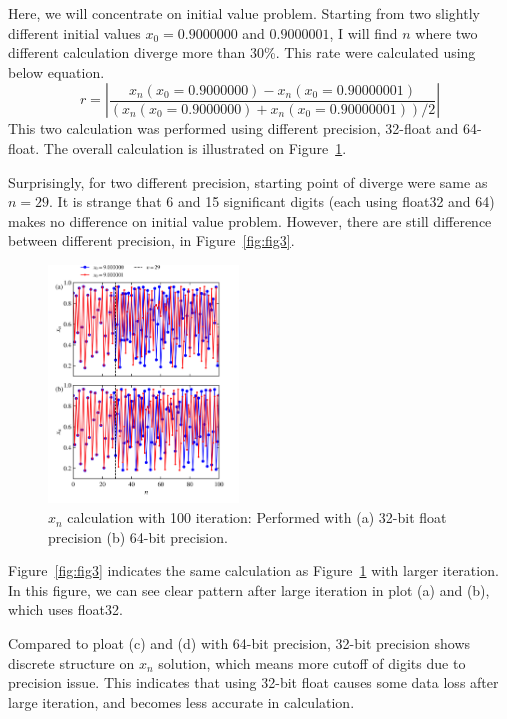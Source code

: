 \documentclass[reprint, nofootinbib]{revtex4-2} %
\begin{document}
Here, we will concentrate on initial value problem. Starting from two slightly different initial values $x_0 = 0.9000000$ and $0.9000001$, I will find $n$ where two different calculation diverge more than 30\%. This rate were calculated using below equation.
\begin{equation}
	r = \left\vert\frac{x_n(x_0=0.9000000)-x_n(x_0=0.90000001)}{(x_n(x_0=0.9000000)+x_n(x_0=0.90000001))/2}\right\vert
\end{equation} 
This two calculation was performed using different precision, 32-float and 64-float. The overall calculation is illustrated on Figure~\ref{fig:fig2}.

Surprisingly, for two different precision, starting point of diverge were same as $n=29$. It is strange that 6 and 15 significant digits (each using float32 and 64) makes no difference on initial value problem. However, there are still difference between different precision, in Figure~\ref{fig:fig3}. 

\begin{figure}[t]
	\includegraphics[width=0.45\textwidth]{fig2.png}
	\caption{$x_n$ calculation with 100 iteration: Performed with (a) 32-bit float precision (b) 64-bit precision.}
	\label{fig:fig2}
\end{figure}

Figure~\ref{fig:fig3} indicates the same calculation as Figure~\ref{fig:fig2} with larger iteration. In this figure, we can see clear pattern after large iteration in plot (a) and (b), which uses float32. 

Compared to ploat (c) and (d) with 64-bit precision, 32-bit precision shows discrete structure on $x_n$ solution, which means more cutoff of digits due to precision issue. This indicates that using 32-bit float causes some data loss after large iteration, and becomes less accurate in calculation.\\ 
\end{document}
